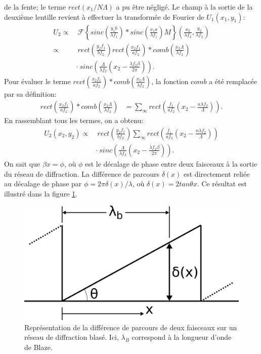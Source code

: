 \documentclass[conference]{IEEEtran}
\begin{document}
de la fente; le terme $rect(x_1/N\Lambda)$ a pu être négligé. Le champ à la sortie de la deuxième lentille revient à effectuer la transformée de Fourier
de $U_1(x_1,y_1)$:
\begin{align*}
    U_2\propto&\ \mathscr{F}\left\{sinc(\frac{y_1b}{\lambda f_1})\ast sinc(\frac{x_1a}{\lambda f_1})M\right\}(\frac{x_2}{\lambda f_2},\frac{y_2}{\lambda f_2})\\
    \propto&\ rect(\frac{y_2 f_1}{b f_2})rect(\frac{x_2 f_1}{a f_2})\ast comb(\frac{x_2 \Lambda}{\lambda f_2})\\
    &\cdot\ sinc(\frac{\Lambda}{\lambda f_2}(x_2-\frac{\lambda f_2 \beta}{2\pi})).
\end{align*}
Pour évaluer le terme $rect(\frac{x_2 f_1}{a f_2})\ast comb(\frac{x_2 \Lambda}{\lambda f_2})$, la fonction $comb$ a été remplacée par sa définition:
\begin{align*}
    rect(\frac{x_2 f_1}{a f_2})\ast comb(\frac{x_2 \Lambda}{\lambda f_2})&=\sum_{\infty}rect(\frac{f_1}{a f_2}(x_2-\frac{n\lambda f_2}{\Lambda})).
\end{align*}
En rassemblant tous les termes, on a obtenu:
\begin{align*}
    U_2(x_2,y_2)\propto&\ rect(\frac{y_2 f_1}{b f_2})\sum_{\infty}rect(\frac{f_1}{a f_2}(x_2-\frac{n\lambda f_2}{\Lambda}))\\
    &\cdot \ sinc(\frac{\Lambda}{\lambda f_2}(x_2-\frac{\lambda f_2 \beta}{2\pi})).
\end{align*}
On sait que $\beta x = \phi$, où $\phi$ est le décalage de phase entre deux faisceaux à la sortie du réseau de diffraction.
La différence de parcours $\delta(x)$ est directement reliée au décalage de phase par $\phi=2\pi\delta(x)/\lambda$, où $\delta(x)=2tan\theta x$.
Ce résultat est illustré dans la figure \ref{beta}. 
\begin{figure}[H]
    \centering
    \includegraphics[scale=0.2]{beta.png}
    \caption{Représentation de la différence de parcours de deux faisceaux sur un réseau de diffraction
    blasé. Ici, $\lambda_B$ correspond à la longueur d'onde de Blaze. \label{beta}}
\end{figure}
\end{document}
